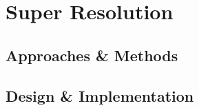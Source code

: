 \chapter{Super Resolution}
\label{chapterlabel5}
\section{Approaches \& Methods}
\section{Design \& Implementation}
